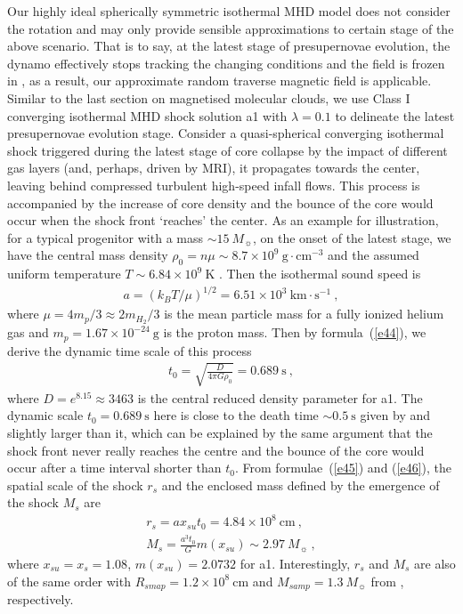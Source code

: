 \documentclass[fleqn,usenatbib]{mnras}
\begin{document}
Our highly ideal spherically symmetric isothermal MHD model does not consider the rotation and may only provide sensible approximations to certain stage of the above scenario. That is to say, at the latest stage of presupernovae evolution, the dynamo effectively stops tracking the changing conditions and the field is frozen in \citep{heger2005presupernova}, as a result, our approximate random traverse magnetic field is applicable. Similar to the last section on magnetised molecular clouds, we use Class I converging isothermal MHD shock solution a1 with $\lambda=0.1$ to delineate the latest presupernovae evolution stage. Consider a quasi-spherical converging isothermal shock triggered during the latest stage of core collapse by the impact of different gas layers (and, perhaps, driven by MRI), it propagates towards the center, leaving behind compressed turbulent high-speed infall flows. This process is accompanied by the increase of core density and the bounce of the core would occur when the shock front `reaches' the center. As an example for illustration, for a typical progenitor with a mass $\sim 15~M_{\sun}$, on the onset of the latest stage, we have the central mass density $\rho_{0}=n\mu\sim 8.7\times 10^{9}~\mathrm{g\cdot cm^{-3}}$ and the assumed uniform temperature $T\sim 6.84\times 10^{9}~\mathrm{K}$ \citep{heger2005presupernova}. Then the isothermal sound speed is
\begin{gather}
a=(k_{B}T/\mu)^{1/2}=6.51\times 10^{3}~\mathrm{km\cdot s^{-1}}\ ,\label{e50}
\end{gather}
where $\mu=4m_{p}/3\approx 2m_{H_{2}}/3$ is the mean particle mass for a fully ionized helium gas and $m_{p}=1.67\times 10^{-24}~\mathrm{g}$ is the proton mass. Then by formula~(\ref{e44}), we derive the dynamic time scale of this process
\begin{gather}
t_{0}=\sqrt{\frac{D}{4\pi G\rho_{0}}}=0.689~\mathrm{s}\ ,
\end{gather}
where $D=e^{8.15}\approx 3463$ is the central reduced density parameter for a1. The dynamic scale $t_{0}=0.689~\mathrm{s}$ here is close to the death time $\sim 0.5~\mathrm{s}$ given by \citet{heger2005presupernova} and slightly larger than it, which can be explained by the same argument that the shock front never really reaches the centre and the bounce of the core would occur after a time interval shorter than $t_{0}$. From formulae~(\ref{e45}) and (\ref{e46}), the spatial scale of the shock $r_{s}$ and the enclosed mass defined by the emergence of the shock $M_{s}$ are
\begin{gather}
r_{s}=ax_{su}t_{0}=4.84\times 10^{8}~\mathrm{cm}\ ,\\
M_{s}=\frac{a^{3}t_{0}}{G}m(x_{su})\sim 2.97~M_{\sun}\ , 
\end{gather}
where $x_{su}=x_{s}=1.08$, $m(x_{su})=2.0732$ for a1. Interestingly, $r_{s}$ and $M_{s}$ are also of the same order with $R_{smap}=1.2\times 10^{8}~\mathrm{cm}$ and $M_{samp}=1.3~M_{\sun}$ from \citet{heger2005presupernova}, respectively.
\end{document}
